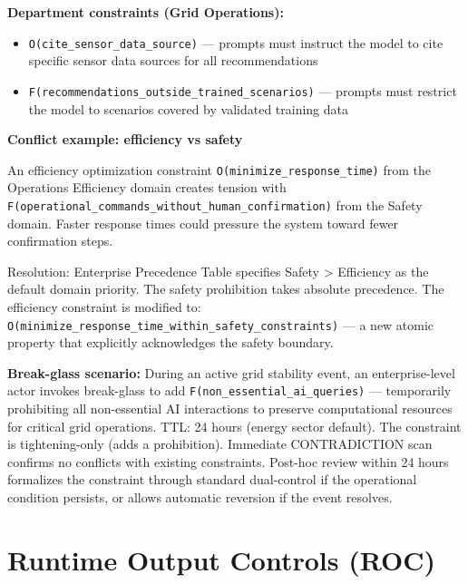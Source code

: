 \textbf{Department constraints (Grid Operations):}
\begin{itemize}
  \item \texttt{O(cite\_\allowbreak{}sensor\_\allowbreak{}data\_\allowbreak{}source)} --- prompts must instruct the model to cite specific sensor data sources for all recommendations
  \item \texttt{F(recommendations\_\allowbreak{}outside\_\allowbreak{}trained\_\allowbreak{}scenarios)} --- prompts must restrict the model to scenarios covered by validated training data
\end{itemize}


\textbf{Conflict example: efficiency vs safety}

An efficiency optimization constraint \texttt{O(minimize\_\allowbreak{}response\_\allowbreak{}time)} from the Operations Efficiency domain creates tension with \texttt{F(operational\_\allowbreak{}commands\_\allowbreak{}without\_\allowbreak{}human\_\allowbreak{}confirmation)} from the Safety domain. Faster response times could pressure the system toward fewer confirmation steps.

Resolution: Enterprise Precedence Table specifies Safety > Efficiency as the default domain priority. The safety prohibition takes absolute precedence. The efficiency constraint is modified to: \texttt{O(minimize\_\allowbreak{}response\_\allowbreak{}time\_\allowbreak{}within\_\allowbreak{}safety\_\allowbreak{}constraints)} --- a new atomic property that explicitly acknowledges the safety boundary.

\textbf{Break-glass scenario:} During an active grid stability event, an enterprise-level actor invokes break-glass to add \texttt{F(non\_\allowbreak{}essential\_\allowbreak{}ai\_\allowbreak{}queries)} --- temporarily prohibiting all non-essential AI interactions to preserve computational resources for critical grid operations. TTL: 24 hours (energy sector default). The constraint is tightening-only (adds a prohibition). Immediate CONTRADICTION scan confirms no conflicts with existing constraints. Post-hoc review within 24 hours formalizes the constraint through standard dual-control if the operational condition persists, or allows automatic reversion if the event resolves.




\section{Runtime Output Controls (ROC)}
\label{sec:clad-examples-B-2}


